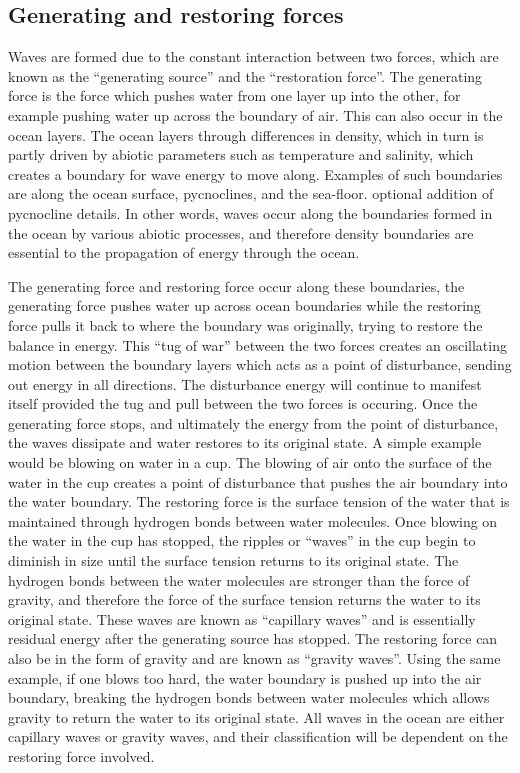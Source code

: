 \documentclass[]{article}
\begin{document}
\hypertarget{generating-and-restoring-forces}{%
\subsection{Generating and restoring
forces}\label{generating-and-restoring-forces}}

Waves are formed due to the constant interaction between two forces,
which are known as the ``generating source'' and the ``restoration
force''. The generating force is the force which pushes water from one
layer up into the other, for example pushing water up across the
boundary of air. This can also occur in the ocean layers. The ocean
layers through differences in density, which in turn is partly driven by
abiotic parameters such as temperature and salinity, which creates a
boundary for wave energy to move along. Examples of such boundaries are
along the ocean surface, pycnoclines, and the sea-floor. optional
addition of pycnocline details. In other words, waves occur along the
boundaries formed in the ocean by various abiotic processes, and
therefore density boundaries are essential to the propagation of energy
through the ocean.

The generating force and restoring force occur along these boundaries,
the generating force pushes water up across ocean boundaries while the
restoring force pulls it back to where the boundary was originally,
trying to restore the balance in energy. This ``tug of war'' between the
two forces creates an oscillating motion between the boundary layers
which acts as a point of disturbance, sending out energy in all
directions. The disturbance energy will continue to manifest itself
provided the tug and pull between the two forces is occuring. Once the
generating force stops, and ultimately the energy from the point of
disturbance, the waves dissipate and water restores to its original
state. A simple example would be blowing on water in a cup. The blowing
of air onto the surface of the water in the cup creates a point of
disturbance that pushes the air boundary into the water boundary. The
restoring force is the surface tension of the water that is maintained
through hydrogen bonds between water molecules. Once blowing on the
water in the cup has stopped, the ripples or ``waves'' in the cup begin
to diminish in size until the surface tension returns to its original
state. The hydrogen bonds between the water molecules are stronger than
the force of gravity, and therefore the force of the surface tension
returns the water to its original state. These waves are known as
``capillary waves'' and is essentially residual energy after the
generating source has stopped. The restoring force can also be in the
form of gravity and are known as ``gravity waves''. Using the same
example, if one blows too hard, the water boundary is pushed up into the
air boundary, breaking the hydrogen bonds between water molecules which
allows gravity to return the water to its original state. All waves in
the ocean are either capillary waves or gravity waves, and their
classification will be dependent on the restoring force involved.
\end{document}
